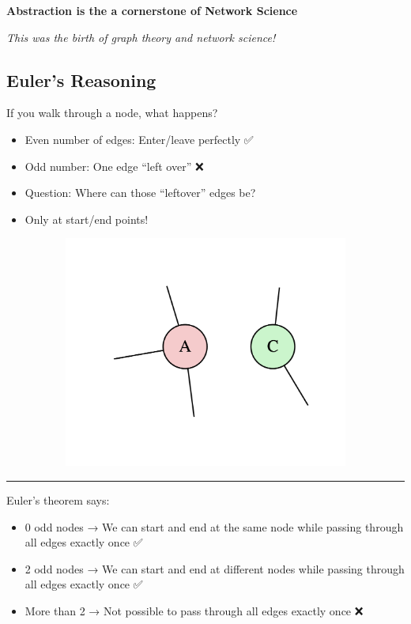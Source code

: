 \documentclass[
  letterpaper,
  DIV=11,
  numbers=noendperiod,
  oneside]{scrartcl}
\providecommand{\tightlist}{%
  \setlength{\itemsep}{0pt}\setlength{\parskip}{0pt}}
\begin{document}
\textbf{Abstraction is the a cornerstone of Network Science}

\emph{This was the birth of graph theory and network science!}

\subsection{Euler's Reasoning 🧮}\label{eulers-reasoning}

If you walk through a node, what happens?

\begin{itemize}
\tightlist
\item
  Even number of edges: Enter/leave perfectly ✅
\item
  Odd number: One edge ``left over'' ❌
\item
  Question: Where can those ``leftover'' edges be?
\item
  Only at start/end points!
\end{itemize}

\includegraphics[width=6in,height=3in]{slide01_files/figure-latex/dot-figure-1.png}

\begin{center}\rule{0.5\linewidth}{0.5pt}\end{center}

Euler's theorem says:

\begin{itemize}
\tightlist
\item
  0 odd nodes → We can start and end at the same node while passing
  through all edges exactly once ✅
\item
  2 odd nodes → We can start and end at different nodes while passing
  through all edges exactly once ✅
\item
  More than 2 → Not possible to pass through all edges exactly once ❌
\end{itemize}
\end{document}
